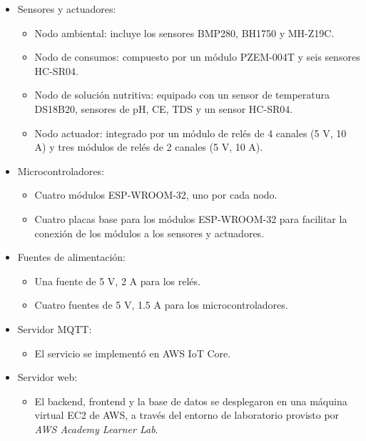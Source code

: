 \begin{itemize}
    \item Sensores y actuadores:
          \begin{itemize}
              \item Nodo ambiental: incluye los sensores BMP280, BH1750 y MH-Z19C.
              \item Nodo de consumos: compuesto por un módulo PZEM-004T y seis sensores HC-SR04.
              \item Nodo de solución nutritiva: equipado con un sensor de temperatura DS18B20,
                    sensores de pH, CE, TDS y un sensor HC-SR04.
              \item Nodo actuador: integrado por un módulo de relés de 4 canales (5 V, 10 A) y tres
                    módulos de relés de 2 canales (5 V, 10 A).
          \end{itemize}

    \item Microcontroladores:
          \begin{itemize}
              \item Cuatro módulos ESP-WROOM-32, uno por cada nodo.
              \item Cuatro placas base \cite{PlacaBaseESP32} para los módulos ESP-WROOM-32 para
                    facilitar la conexión de los módulos a los sensores y actuadores.
          \end{itemize}

    \item Fuentes de alimentación:
          \begin{itemize}
              \item Una fuente de 5 V, 2 A para los relés.
              \item Cuatro fuentes de 5 V, 1.5 A para los microcontroladores.
          \end{itemize}

    \item Servidor MQTT:
          \begin{itemize}
              \item El servicio se implementó en AWS IoT Core.
          \end{itemize}

    \item Servidor web:
          \begin{itemize}
              \item El backend, frontend y la base de datos se desplegaron en una máquina virtual
                    EC2 de AWS, a través del entorno de laboratorio provisto por \textit{AWS
                        Academy Learner Lab}.
          \end{itemize}
\end{itemize}

